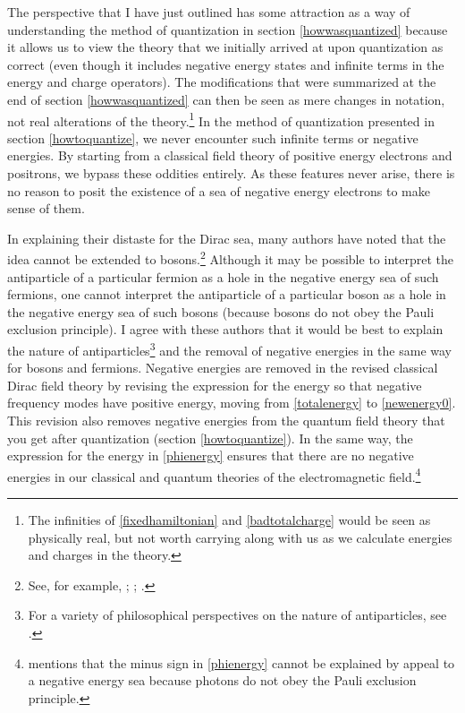 \documentclass[12pt,secnumarabic,amsmath,amssymb,balancelastpage,nofootinbib]{article}
\begin{document}
The perspective that I have just outlined has some attraction as a way of understanding the method of quantization in section \ref{howwasquantized} because it allows us to view the theory that we initially arrived at upon quantization as correct (even though it includes negative energy states and infinite terms in the energy and charge operators).  The modifications that were summarized at the end of section \ref{howwasquantized} can then be seen as mere changes in notation, not real alterations of the theory.\footnote{The infinities of \eqref{fixedhamiltonian} and \eqref{badtotalcharge} would be seen as physically real, but not worth carrying along with us as we calculate energies and charges in the theory.}  In the method of quantization presented in section \ref{howtoquantize}, we never encounter such infinite terms or negative energies.  By starting from a classical field theory of positive energy electrons and positrons, we bypass these oddities entirely.  As these features never arise, there is no reason to posit the existence of a sea of negative energy electrons to make sense of them.

In explaining their distaste for the Dirac sea, many authors have noted that the idea cannot be extended to bosons.\footnote{See, for example, \citet[pg.\ 119--120]{weinberg1985}; \citet[sec.\ 5.3]{tong}; \citet[pg.\ 142]{schwartz}.}  Although it may be possible to interpret the antiparticle of a particular fermion as a hole in the negative energy sea of such fermions, one cannot interpret the antiparticle of a particular boson as a hole in the negative energy sea of such bosons (because bosons do not obey the Pauli exclusion principle).  I agree with these authors that it would be best to explain the nature of antiparticles\footnote{For a variety of philosophical perspectives on the nature of antiparticles, see \citet{saunders1991, saunders1992, wallace2009, arntzenius2009, baker2010, deckert}.} and the removal of negative energies in the same way for bosons and fermions.  Negative energies are removed in the revised classical Dirac field theory by revising the expression for the energy so that negative frequency modes have positive energy, moving from \eqref{totalenergy} to \eqref{newenergy0}.  This revision also removes negative energies from the quantum field theory that you get after quantization (section \ref{howtoquantize}).  In the same way, the expression for the energy in \eqref{phienergy} ensures that there are no negative energies in our classical and quantum theories of the electromagnetic field.\footnote{\citet[pg.\ 1918]{good1957} mentions that the minus sign in \eqref{phienergy} cannot be explained by appeal to a negative energy sea because photons do not obey the Pauli exclusion principle.}
\end{document}
